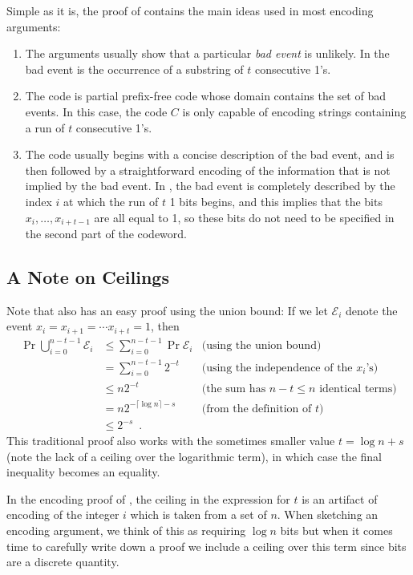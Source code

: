 \documentclass{patmorin}
\begin{document}
Simple as it is, the proof of  contains the main ideas
used in most encoding arguments:

\begin{enumerate}
\item The arguments usually show that a particular \emph{bad event} is
  unlikely.  In  the bad event is the occurrence of a
  substring of $t$ consecutive 1's.

\item The code is partial prefix-free code whose domain contains the 
  set of bad events.  In this case, the code $C$ is only capable of
  encoding strings containing a run of $t$ consecutive 1's.

\item The code usually begins with a
  concise description of the bad event, and is then followed by a
  straightforward encoding of the information that is not implied by the
  bad event. In , the bad event is completely described by
  the index $i$ at which the run of $t$ 1 bits begins, and this implies
  that the bits $x_i,\ldots,x_{i+t-1}$ are all equal to 1, so these bits
  do not need to be specified in the second part of the codeword.
\end{enumerate}

\subsection{A Note on Ceilings}

Note that  also has an easy proof using the union bound:
If we let $\mathcal{E}_i$ denote the event $x_i=x_{i+1}=\cdots x_{i+t}=1$, then
\begin{align*}
\Pr \bigcup_{i=0}^{n-t-1} \mathcal{E}_i  
   & \le \sum_{i=0}^{n-t-1} \Pr\mathcal{E}_i & \text{(using the union bound)}\\
   & = \sum_{i=0}^{n-t-1} 2^{-t} & \text{(using the independence of the $x_i$'s)}\\
   & \le n2^{-t} & \text{(the sum has $n-t\le n$ identical terms)}\\
   & = n2^{-\lceil\log n\rceil-s} & \text{(from the definition of $t$)}\\
   & \le 2^{-s} \enspace .
\end{align*}
This traditional proof also works with the sometimes smaller value
$t=\log n+s$ (note the lack of a ceiling over the logarithmic term),
in which case the final inequality becomes an equality.

In the encoding proof of , the ceiling in the expression
for $t$ is an artifact of encoding of the integer $i$ which is taken
from a set of $n$. When sketching an encoding argument, we think of
this as requiring $\log n$ bits but when it comes time to carefully
write down a proof we include a ceiling over this term since bits are
a discrete quantity.
\end{document}
